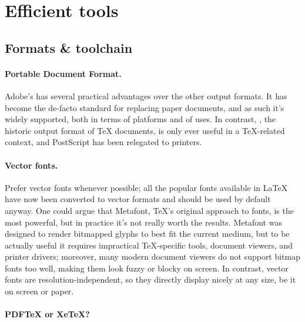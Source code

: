 \documentclass[a4paper,twoside,nofonts]{tufte-handout}
\begin{document}
\clearpage
\section{Efficient tools} %
\label{sec:tools}


\subsection{Formats \& toolchain} %
\label{toolchain}

\paragraph{Portable Document Format.}

Adobe's  has several practical advantages over the other output formats.
It has become the de-facto standard for replacing paper documents, and as such it's widely supported, both in terms of platforms and of uses.
In contrast, , the historic output format of \TeX{} documents, is only ever useful in a \TeX-related context, and PostScript has been relegated to printers.

\paragraph{Vector fonts.}

Prefer vector fonts whenever possible; all the popular fonts available in \LaTeX{} have now been converted to vector formats and should be used by default anyway.
One could argue that Metafont, \TeX's original approach to fonts, is the most powerful, but in practice it's not really worth the results.
Metafont was designed to render bitmapped glyphs to best fit the current medium, but to be actually useful it requires impractical \TeX-specific tools, document viewers, and printer drivers; moreover, many modern document viewers do not support bitmap fonts too well, making them look fuzzy or blocky on screen.
In contrast, vector fonts are resolution-independent, so they directly display nicely at any size, be it on screen or paper.

\paragraph{PDF\TeX{} or Xe\TeX?}
\end{document}
